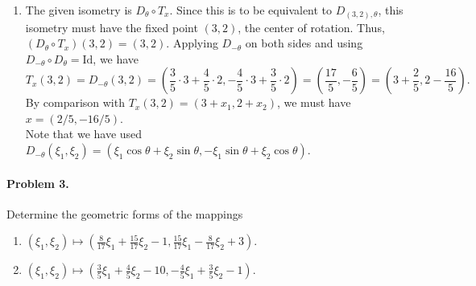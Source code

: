 \documentclass[10pt]{article}
\begin{document}
\begin{enumerate}
        \item The given isometry is $D_\theta\circ T_x$.
        Since this is to be equivalent to $D_{(3, 2),\theta}$, this isometry must have the fixed point $(3, 2)$, the center of rotation.
        Thus, $(D_\theta\circ T_x)(3, 2) = (3, 2)$.
        Applying $D_{-\theta}$ on both sides and using $D_{-\theta} \circ D_{\theta} = \text{Id}$, we have
        \[T_x(3, 2) = D_{-\theta}(3, 2) = \left(\frac{3}{5}\cdot 3 + \frac{4}{5}\cdot 2, -\frac{4}{5}\cdot 3 + \frac{3}{5}\cdot 2\right)
                = \left(\frac{17}{5}, -\frac{6}{5}\right) = \left(3 + \frac{2}{5}, 2 - \frac{16}{5}\right). \]
        By comparison with $T_x(3, 2) = (3 + x_1, 2 + x_2)$, we must have $x = (2 /5, -16 /5)$. \\
        
        Note that we have used $D_{-\theta}(\xi_1, \xi_2) = (\xi_1\cos\theta + \xi_2\sin\theta, -\xi_1\sin\theta + \xi_2\cos\theta)$.
        \end{enumerate} 

        \paragraph{Problem 3.} Determine the geometric forms of the mappings
        \begin{enumerate}
                \item $(\xi_1, \xi_2) \mapsto (\frac{8}{17}\xi_1 + \frac{15}{17}\xi_2 - 1, \frac{15}{17}\xi_1 - \frac{8}{17}\xi_2 + 3)$.
                \item $(\xi_1, \xi_2) \mapsto (\frac{3}{5}\xi_1 + \frac{4}{5}\xi_2 - 10, -\frac{4}{5}\xi_1 + \frac{3}{5}\xi_2 - 1)$.
        \end{enumerate}
\end{document}
